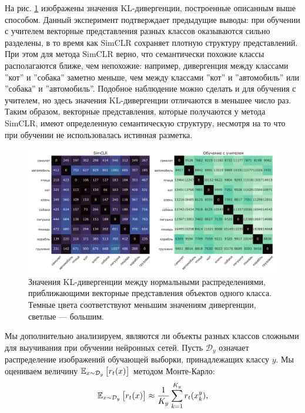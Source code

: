 На рис. \ref{visual:pic:2} изображены значения KL-дивергенции, построенные описанным выше способом. Данный эксперимент подтверждает предыдущие выводы: при обучении с учителем векторные представления разных классов оказываются сильно разделены, в то время как SimCLR сохраняет плотную структуру представлений. При этом для метода SimCLR верно, что семантически похожие классы располагаются ближе, чем непохожие: например, дивергенция между классами ''кот'' и ''собака'' заметно меньше, чем между классами ''кот'' и ''автомобиль'' или ''собака'' и ''автомобиль''. Подобное наблюдение можно сделать и для обучения с учителем, но здесь значения KL-дивергенции отличаются в меньшее число раз. Таким образом, векторные представления, которые получаются у метода SimCLR, имеют определенную семантическую структуру, несмотря на то что при обучении не использовалась истинная разметка.

\begin{figure}[H]
    \centering
    \includegraphics[width=17cm]{images/kl_divergence.pdf}
    \caption{Значения KL-дивергенции между нормальными распределениями, приближающими векторные представления объектов одного класса. Темные цвета соответствуют меньшим значениям дивергенции, светлые --- большим.}
    \label{visual:pic:2}
\end{figure}{}

Мы дополнительно анализируем, являются ли объекты разных классов сложными для выучивания при обучении нейронных сетей. Пусть $\mathcal{D}_y$ означает распределение изображений обучающей выборки, принадлежащих классу $y$. Мы оцениваем величину $\operatorname{\mathbb{E}}_{x \sim \mathcal{D}_y} \big[r_t(x)\big]$ методом Монте-Карло:
\begin{equation}
    \operatorname{\mathbb{E}}_{x \sim \mathcal{D}_y} \big[r_t(x)\big] \approx \frac{1}{K_y} \sum_{k=1}^{K_y} r_t(x_k^y),
\end{equation}

